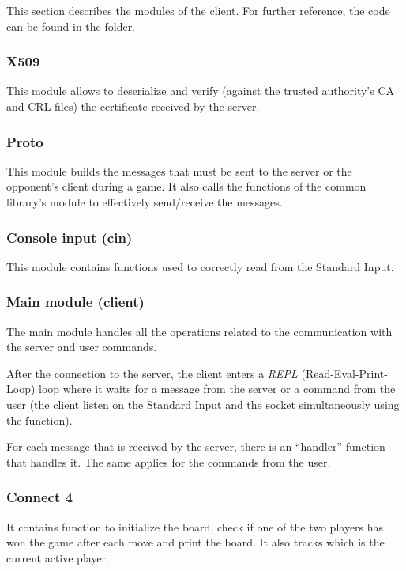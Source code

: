 This section describes the modules of the client. For further reference, the
code can be found in the  folder.

\subsubsection{X509}

This module allows to deserialize and verify (against the trusted authority's CA
and CRL files) the certificate received by the server.

\subsubsection{Proto}

This module builds the messages that must be sent to the server or the
opponent's client during a game. It also calls the functions of the common
library's  module to effectively send/receive the messages.

\subsubsection{Console input (cin)}

This module contains functions used to correctly read from the Standard Input.

\subsubsection{Main module (client)}

The main module handles all the operations related to the communication with the
server and user commands.

After the connection to the server, the client enters a \emph{REPL}
(Read-Eval-Print-Loop) loop where it waits for a message from the server or a
command from the user (the client listen on the Standard Input and the socket
simultaneously using the  function).

For each message that is received by the server, there is an ``handler''
function that handles it. The same applies for the commands from the user.

\subsubsection{Connect 4}

It contains function to initialize the board, check if one of the two players
has won the game after each move and print the board. It also tracks which is
the current active player.

